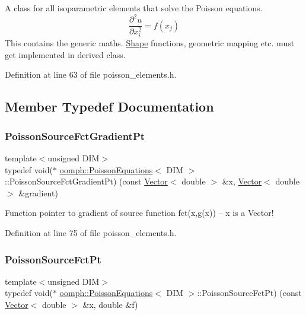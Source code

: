 A class for all isoparametric elements that solve the Poisson equations. \[ \frac{\partial^2 u}{\partial x_i^2} = f(x_j) \] This contains the generic maths. \hyperlink{classoomph_1_1Shape}{Shape} functions, geometric mapping etc. must get implemented in derived class. 

Definition at line 63 of file poisson\+\_\+elements.\+h.



\subsection{Member Typedef Documentation}
\mbox{\label{classoomph_1_1PoissonEquations_a6182c46eb07d6219d6f939f0962724c4}} 
\subsubsection{\texorpdfstring{Poisson\+Source\+Fct\+Gradient\+Pt}{PoissonSourceFctGradientPt}}
{\footnotesize\ttfamily template$<$unsigned D\+IM$>$ \\
typedef void($\ast$ \hyperlink{classoomph_1_1PoissonEquations}{oomph\+::\+Poisson\+Equations}$<$ D\+IM $>$\+::Poisson\+Source\+Fct\+Gradient\+Pt) (const \hyperlink{classoomph_1_1Vector}{Vector}$<$ double $>$ \&x, \hyperlink{classoomph_1_1Vector}{Vector}$<$ double $>$ \&gradient)}



Function pointer to gradient of source function fct(x,g(x)) -- x is a Vector! 



Definition at line 75 of file poisson\+\_\+elements.\+h.

\mbox{\label{classoomph_1_1PoissonEquations_a1e3a857c1f506c99d437fb932a24c828}} 
\subsubsection{\texorpdfstring{Poisson\+Source\+Fct\+Pt}{PoissonSourceFctPt}}
{\footnotesize\ttfamily template$<$unsigned D\+IM$>$ \\
typedef void($\ast$ \hyperlink{classoomph_1_1PoissonEquations}{oomph\+::\+Poisson\+Equations}$<$ D\+IM $>$\+::Poisson\+Source\+Fct\+Pt) (const \hyperlink{classoomph_1_1Vector}{Vector}$<$ double $>$ \&x, double \&f)}



